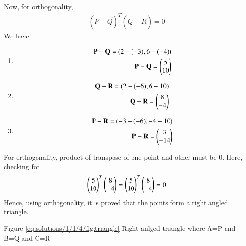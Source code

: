 Now, for orthogonality, 
\begin{align}
    (\vec{P-Q})^T(\vec{Q-R}) = 0
\end{align}
We have 
\begin{enumerate}
    
    \item \begin{align}
    \mathbf{P-Q} = (2-(-3), 6-(-4))
\\
\mathbf{P-Q} = \begin{pmatrix}
5\\
10 
\end{pmatrix}
\end{align}
    \item \begin{align}
    \mathbf{Q-R} = (2-(-6), 6-10)
\\
\mathbf{Q-R} = \begin{pmatrix}
8\\
-4 
\end{pmatrix}
\end{align}
\item \begin{align}
    \mathbf{P-R} = (-3-(-6), -4-10)
\\
\mathbf{P-R} = \begin{pmatrix}
3\\
-14 
\end{pmatrix}
\end{align}
\end{enumerate}
For orthogonality, product of transpose of one point and other must be 0. 
Here, checking for 
\begin{align}
    \begin{pmatrix}
5\\
10 
\end{pmatrix}^T\begin{pmatrix} 8\\
-4
\end{pmatrix} =  \begin{pmatrix}
5\\
10
\end{pmatrix}^T \begin{pmatrix}
8 \\ -4
\end{pmatrix}=0
\end{align}
Hence, using orthogonality, it is proved that the points form a right angled triangle. 


Figure \ref{eq:solutions/1/1/4/fig:triangle} Right anlged triangle where A=P and B=Q and C=R


